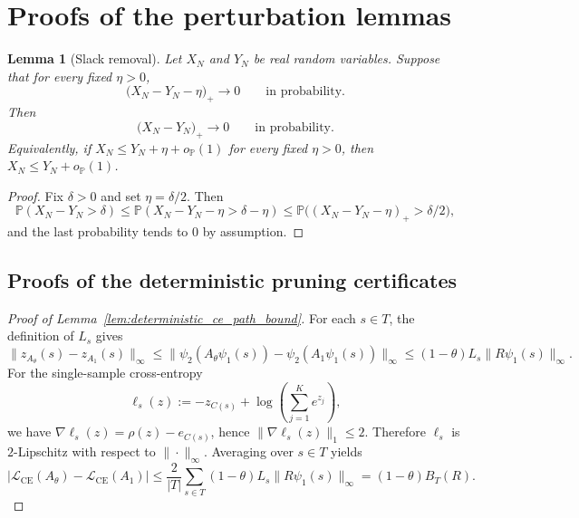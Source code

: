 \documentclass[11pt]{article}
\theoremstyle{plain}
\newtheorem{lem}[thm]{Lemma}
\theoremstyle{definition}
\theoremstyle{remark}
\newcommand{\PP}{\mathbb{P}}
\newcommand{\1}{\mathbf{1}}
\begin{document}

\section{Proofs of the perturbation lemmas}
\label{app:proof_perturb}

\begin{lem}[Slack removal]
\label{lem:slack_removal}
Let \(X_N\) and \(Y_N\) be real random variables. Suppose that for every fixed \(\eta>0\),
\[
\big(X_N-Y_N-\eta\big)_+\to0
\qquad\text{in probability}.
\]
Then
\[
\big(X_N-Y_N\big)_+\to0
\qquad\text{in probability}.
\]
Equivalently, if \(X_N\le Y_N+\eta+o_{\PP}(1)\) for every fixed \(\eta>0\), then \(X_N\le Y_N+o_{\PP}(1)\).
\end{lem}

\begin{proof}
Fix \(\delta>0\) and set \(\eta=\delta/2\). Then
\[
\PP(X_N-Y_N>\delta)
\le
\PP(X_N-Y_N-\eta>\delta-\eta)
\le
\PP\big((X_N-Y_N-\eta)_+>\delta/2\big),
\]
and the last probability tends to \(0\) by assumption.
\end{proof}

\subsection{Proofs of the deterministic pruning certificates}

\begin{proof}[Proof of Lemma~\ref{lem:deterministic_ce_path_bound}]
For each \(s\in T\), the definition of \(L_s\) gives
\[
\|z_{A_\theta}(s)-z_{A_1}(s)\|_\infty
\le
\| \psi_2(A_\theta\psi_1(s))-\psi_2(A_1\psi_1(s))\|_\infty
\le
(1-\theta)L_s\|R\psi_1(s)\|_\infty.
\]
For the single-sample cross-entropy
\[
\ell_s(z):=-z_{C(s)}+\log\!\left(\sum_{j=1}^K e^{z_j}\right),
\]
we have \(\nabla\ell_s(z)=\rho(z)-e_{C(s)}\), hence \(\|\nabla\ell_s(z)\|_1\le2\). Therefore \(\ell_s\) is \(2\)-Lipschitz with respect to \(\|\cdot\|_\infty\). Averaging over \(s\in T\) yields
\[
\left|
\mathcal L_{\mathrm{CE}}(A_\theta)-\mathcal L_{\mathrm{CE}}(A_1)
\right|
\le
\frac2{|T|}\sum_{s\in T}(1-\theta)L_s\|R\psi_1(s)\|_\infty
=
(1-\theta)B_T(R).
\]
\end{proof}
\end{document}
